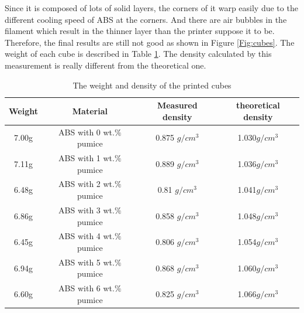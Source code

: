 Since it is composed of lots of solid layers, the corners of it warp easily due to the different cooling speed of ABS at the corners. And there are air bubbles in the filament which result in the thinner layer than the printer suppose it to be. Therefore, the final results are still not good as shown in Figure \ref{Fig:cubes}. The weight of each cube is described in Table \ref{tab:cube density}. The density calculated by this measurement is really different from the theoretical one.
\begin{table}[htbp]
\centering
\caption {The weight and density of the printed cubes}
\begin{tabular}{c c c c}
\hline
\textbf{Weight} & \textbf{Material} & \textbf{Measured density} & \textbf{theoretical density}\\
\hline
7.00g & ABS with 0 wt.$\%$ pumice &  0.875 $g/cm^3$ &  1.030$g/cm^3$ \\
7.11g & ABS with 1 wt.$\%$ pumice & 0.889 $g/cm^3$ &  1.036$g/cm^3$  \\
6.48g & ABS with 2 wt.$\%$ pumice &  0.81 $g/cm^3$&  1.041$g/cm^3$  \\
6.86g & ABS with 3 wt.$\%$ pumice &  0.858 $g/cm^3$&  1.048$g/cm^3$  \\
6.45g & ABS with 4 wt.$\%$ pumice &  0.806 $g/cm^3$&  1.054$g/cm^3$  \\
6.94g & ABS with 5 wt.$\%$ pumice &  0.868 $g/cm^3$&  1.060$g/cm^3$  \\
6.60g & ABS with 6 wt.$\%$ pumice &  0.825 $g/cm^3$&  1.066$g/cm^3$  \\
\hline
\end{tabular}
\label{tab:cube density}
\end{table}


